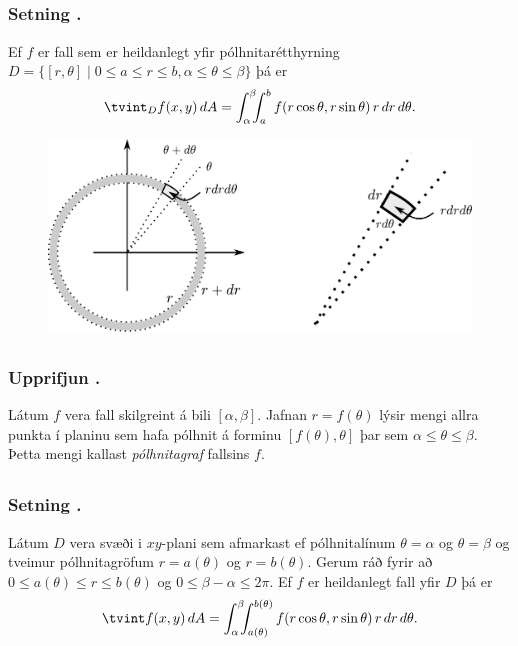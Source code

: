 \subsection{} 

\subsubsection{Setning \kaflanr.}
Ef $f$ er fall sem er heildanlegt yfir 
pólhnitarétthyrning
$D=\{[r,\theta]\mid 0\leq a\leq r\leq b, \alpha\leq \theta\leq\beta\}$
þá er 
$$\tvint_D f(x,y)\,dA=\int_\alpha^\beta\!\!\!\int_{a}^{b}
f(r\cos\theta,r\sin\theta)\,r\,dr\, d\theta.$$

\begin {figure}[h!]
 \centering
            \includegraphics[width=0.85\linewidth]{polarelement}
\end {figure}


\subsection{} 

\subsubsection{Upprifjun \kaflanr.}
Látum $f$ vera fall skilgreint á bili 
$[\alpha,\beta]$.  Jafnan $r=f(\theta)$ lýsir mengi allra punkta í
planinu sem hafa pólhnit á forminu $[f(\theta),\theta]$ þar sem
$\alpha\leq\theta\leq\beta$.  Þetta mengi kallast {\em pólhnitagraf}
fallsins $f$. 






\subsection{} 

\subsubsection{Setning \kaflanr.}
Látum $D$ vera svæði i $xy$-plani sem
afmarkast ef pólhnitalínum $\theta=\alpha$ og $\theta=\beta$ og
tveimur pólhnitagröfum $r=a(\theta)$ og $r=b(\theta)$.  Gerum ráð
fyrir að $0\leq a(\theta)\leq
r\leq b(\theta)$ og $0\leq \beta-\alpha\leq 2\pi$.
Ef $f$ er heildanlegt fall yfir $D$
þá er 
$$\tvint f(x,y)\,dA=\int_\alpha^\beta\!\!\!\int_{a(\theta)}^{b(\theta)}
f(r\cos\theta,r\sin\theta)\,r\,dr\, d\theta.$$


